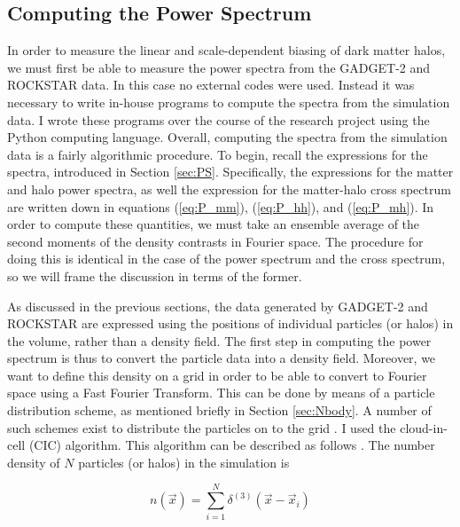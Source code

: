 \documentclass[10pt,letterpaper,final]{iopart}
\numberwithin{equation}{subsection}
\begin{document}
%

\subsection{Computing the Power Spectrum}\label{sec:PSExp}

In order to measure the linear and scale-dependent biasing of dark matter halos, we must first be able to measure the power spectra from the GADGET-2 and ROCKSTAR data. In this case no external codes were used. Instead it was necessary to write in-house programs to compute the spectra from the simulation data. I wrote these programs over the course of the research project using the Python computing language. Overall, computing the spectra from the simulation data is a fairly algorithmic procedure. To begin, recall the expressions for the spectra, introduced in Section \ref{sec:PS}. Specifically, the expressions for the matter and halo power spectra, as well the expression for the matter-halo cross spectrum are written down in equations (\ref{eq:P_mm}), (\ref{eq:P_hh}), and (\ref{eq:P_mh}). In order to compute these quantities, we must take an ensemble average of the second moments of the density contrasts in Fourier space. The procedure for doing this is identical in the case of the power spectrum and the cross spectrum, so we will frame the discussion in terms of the former. 

As discussed in the previous sections, the data generated by GADGET-2 and ROCKSTAR are expressed using the positions of individual particles (or halos) in the volume, rather than a density field. The first step in computing the power spectrum is thus to convert the particle data into a density field. Moreover, we want to define this density on a grid in order to be able to convert to Fourier space using a Fast Fourier Transform. This can be done by means of a particle distribution scheme, as mentioned briefly in Section \ref{sec:Nbody}. A number of such schemes exist to distribute the particles on to the grid \cite{Donghui}. I used the cloud-in-cell (CIC) algorithm. This algorithm can be described as follows \cite{Donghui}. The number density of $N$ particles (or halos) in the simulation is

\begin{equation}\label{eq:CICn}
n(\vec{x}) = \sum_{i=1}^{N} \delta^{(3)}(\vec{x} - \vec{x}_i)
\end{equation}
\end{document}
